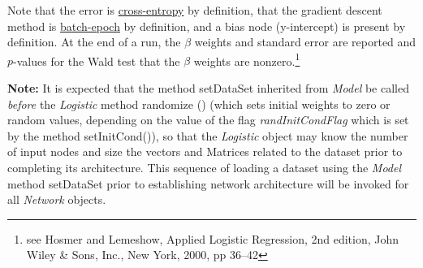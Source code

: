 \documentclass{report}
\begin{document}
Note that the error is \hyperref[xentropyfunk]{cross-entropy} by
definition, that the gradient descent method is
\hyperref[batchepochdef]
{batch-epoch} by definition, and a bias node (y-intercept) is present
by definition.  At the end of a run, the $\beta$ weights and standard
error are reported and $p$-values for the Wald test that the $\beta$
weights are nonzero.\footnote{see Hosmer and Lemeshow, Applied
Logistic Regression, 2nd edition, John Wiley \& Sons, Inc., New York,
2000, pp 36--42}

{\bf Note:} It is expected that the method setDataSet inherited from
{\em Model} be called {\em before} the {\em Logistic} method randomize
() (which sets initial weights to zero or random values, depending on
the value of the flag {\em randInitCondFlag} which is set by the
method setInitCond()), so that the {\em Logistic} object may know the
number of input nodes and size the vectors and Matrices related to the
dataset prior to completing its architecture.  This sequence of
loading a dataset using the {\em Model} method setDataSet prior to
establishing network architecture will be invoked for all {\em
Network} objects.
\end{document}
